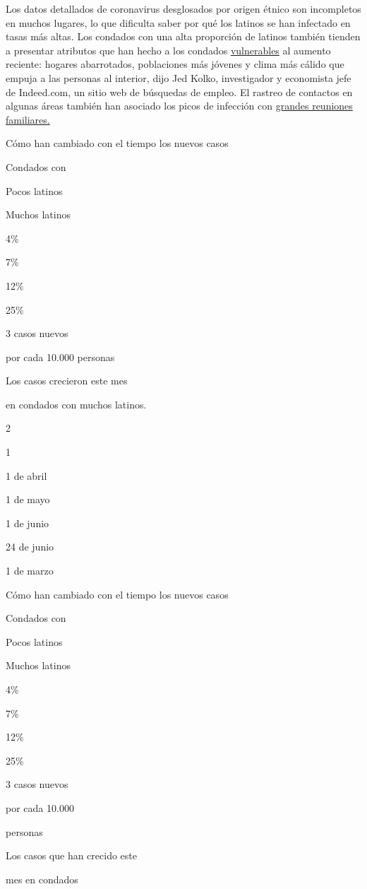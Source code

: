 Los datos detallados de coronavirus desglosados por origen étnico son
incompletos en muchos lugares, lo que dificulta saber por qué los
latinos se han infectado en tasas más altas. Los condados con una alta
proporción de latinos también tienden a presentar atributos que han
hecho a los condados
\href{http://jedkolko.com/2020/06/21/the-changing-geography-of-covid19/}{vulnerables}
al aumento reciente: hogares abarrotados, poblaciones más jóvenes y
clima más cálido que empuja a las personas al interior, dijo Jed Kolko,
investigador y economista jefe de Indeed.com, un sitio web de búsquedas
de empleo. El rastreo de contactos en algunas áreas también han asociado
los picos de infección con
\href{https://www.sacbee.com/news/coronavirus/article243376046.html}{grandes
reuniones familiares.}

Cómo han cambiado con el tiempo los nuevos casos

Condados con

Pocos latinos

Muchos latinos

4\%

7\%

12\%

25\%

3 casos nuevos

por cada 10.000 personas

Los casos crecieron este mes

en condados con muchos latinos.

2

1

1 de abril

1 de mayo

1 de junio

24 de junio

1 de marzo

Cómo han cambiado con el tiempo los nuevos casos

Condados con

Pocos latinos

Muchos latinos

4\%

7\%

12\%

25\%

3 casos nuevos

por cada 10.000

personas

Los casos que han crecido este

mes en condados

